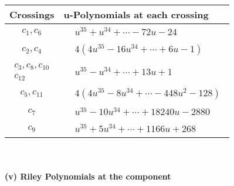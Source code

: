 \documentclass[1p]{elsarticle_modified}
\theoremstyle{definition}
\begin{document}
\begin{tabular}{m{50pt}|m{274pt}}
Crossings & \hspace{64pt}u-Polynomials at each crossing \\
\hline $$\begin{aligned}c_{1},c_{6}\end{aligned}$$&$\begin{aligned}
&u^{35}+u^{34}+\cdots-72 u-24
\end{aligned}$\\
\hline $$\begin{aligned}c_{2},c_{4}\end{aligned}$$&$\begin{aligned}
&4(4 u^{35}-16 u^{34}+\cdots+6 u-1)
\end{aligned}$\\
\hline $$\begin{aligned}c_{3},c_{8},c_{10}\\c_{12}\end{aligned}$$&$\begin{aligned}
&u^{35}- u^{34}+\cdots+13 u+1
\end{aligned}$\\
\hline $$\begin{aligned}c_{5},c_{11}\end{aligned}$$&$\begin{aligned}
&4(4 u^{35}-8 u^{34}+\cdots-448 u^2-128)
\end{aligned}$\\
\hline $$\begin{aligned}c_{7}\end{aligned}$$&$\begin{aligned}
&u^{35}-10 u^{34}+\cdots+18240 u-2880
\end{aligned}$\\
\hline $$\begin{aligned}c_{9}\end{aligned}$$&$\begin{aligned}
&u^{35}+5 u^{34}+\cdots+1166 u+268
\end{aligned}$\\
\hline
\end{tabular}\\~\\
\newpage\renewcommand{\arraystretch}{1}
\flushleft \textbf{(v) Riley Polynomials at the component}\newline \\
\end{document}
